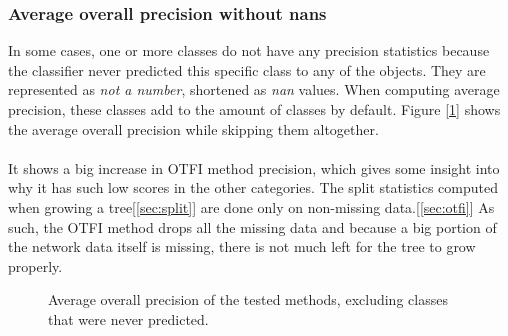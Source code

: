 \documentclass[11pt]{article}
\begin{document}
      \subsubsection{Average overall precision without nans}
        In some cases, one or more classes do not have any precision statistics because the classifier never predicted this specific class to any of the objects. They are represented as {\it not a number}, shortened as {\it nan} values. When computing average precision, these classes add to the amount of classes by default. Figure [\ref{figure:overall_prec_no_nan}] shows the average overall precision while skipping them altogether.
        \\~\\
        It shows a big increase in OTFI method precision, which gives some insight into why it has such low scores in the other categories. The split statistics computed when growing a tree[\ref{sec:split}] are done only on non-missing data.[\ref{sec:otfi}] As such, the OTFI method drops all the missing data and because a big portion of the network data itself is missing, there is not much left for the tree to grow properly.
        \begin{figure}
          \centering
          \caption{Average overall precision of the tested methods, excluding classes that were never predicted.}
          \label{figure:overall_prec_no_nan}
        \end{figure}
\end{document}
